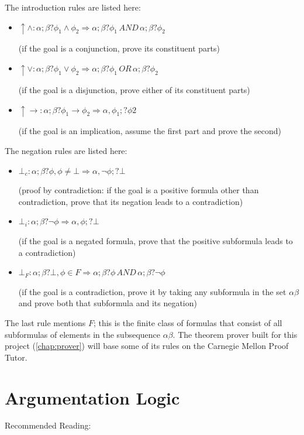 \documentclass[11pt,twoside,a4paper]{report}
\begin{document}
The introduction rules are listed here:
\begin{itemize}
\item
$\uparrow\wedge: \alpha;\beta?\phi_1\wedge\phi_2 \Rightarrow \alpha;\beta?\phi_1\, AND\, \alpha;\beta?\phi_2$

(if the goal is a conjunction, prove its constituent parts)
\item
$\uparrow\vee: \alpha;\beta?\phi_1\vee\phi_2 \Rightarrow \alpha;\beta?\phi_1\, OR\, \alpha;\beta?\phi_2$

(if the goal is a disjunction, prove either of its constituent parts)
\item
$\uparrow\rightarrow: \alpha;\beta?\phi_1\rightarrow\phi_2 \Rightarrow \alpha,\phi_1;?\phi2$

(if the goal is an implication, assume the first part and prove the second)
\end{itemize}

The negation rules are listed here:
\begin{itemize}
\item
$\bot_c: \alpha;\beta?\phi, \phi\neq\bot \Rightarrow \alpha,\neg\phi;?\bot$

(proof by contradiction: if the goal is a positive formula other than contradiction, prove that its negation leads to a contradiction)
\item
$\bot_i: \alpha;\beta?\neg\phi \Rightarrow \alpha,\phi;?\bot$

(if the goal is a negated formula, prove that the positive subformula leads to a contradiction)
\item
$\bot_F: \alpha;\beta?\bot, \phi\in F \Rightarrow \alpha;\beta?\phi\, AND\, \alpha;\beta?\neg\phi$

(if the goal is a contradiction, prove it by taking any subformula in the set $\alpha\beta$ and prove both that subformula and its negation)
\end{itemize}

The last rule mentions $F$; this is the finite class of formulas that consist of all subformulas of elements in the subsequence $\alpha\beta$. The theorem prover built for this project (\autoref{chap:prover}) will base some of its rules on the Carnegie Mellon Proof Tutor.

\section{Argumentation Logic}
Recommended Reading: \citep*{alpaper}
\end{document}
